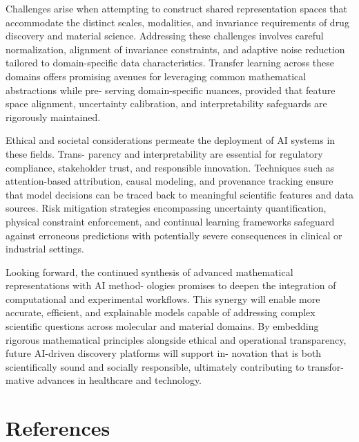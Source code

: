 \documentclass[
]{article}
\begin{document}
Challenges arise when attempting to construct shared representation
spaces that accommodate the distinct scales, modalities, and invariance
requirements of drug discovery and material science. Addressing these
challenges involves careful normalization, alignment of invariance
constraints, and adaptive noise reduction tailored to domain-specific
data characteristics. Transfer learning across these domains offers
promising avenues for leveraging common mathematical abstractions while
pre- serving domain-specific nuances, provided that feature space
alignment, uncertainty calibration, and interpretability safeguards are
rigorously maintained.

Ethical and societal considerations permeate the deployment of AI
systems in these fields. Trans- parency and interpretability are
essential for regulatory compliance, stakeholder trust, and responsible
innovation. Techniques such as attention-based attribution, causal
modeling, and provenance tracking ensure that model decisions can be
traced back to meaningful scientific features and data sources. Risk
mitigation strategies encompassing uncertainty quantification, physical
constraint enforcement, and continual learning frameworks safeguard
against erroneous predictions with potentially severe consequences in
clinical or industrial settings.

Looking forward, the continued synthesis of advanced mathematical
representations with AI method- ologies promises to deepen the
integration of computational and experimental workflows. This synergy
will enable more accurate, efficient, and explainable models capable of
addressing complex scientific questions across molecular and material
domains. By embedding rigorous mathematical principles alongside ethical
and operational transparency, future AI-driven discovery platforms will
support in- novation that is both scientifically sound and socially
responsible, ultimately contributing to transfor- mative advances in
healthcare and technology.

\hypertarget{references}{%
\section{References}\label{references}}
\end{document}
